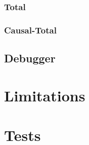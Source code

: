 \documentclass[titlepage, twocolumn, a4paper, 10pt]{article}
\begin{document}
\subsubsection{Total}\label{sec:total}
\subsubsection{Causal-Total}\label{sec:causal-total}


\subsection{Debugger}\label{sec:debugger}





\section{Limitations}\label{sec:limitations}


\section{Tests}\label{sec:tests}
\end{document}
